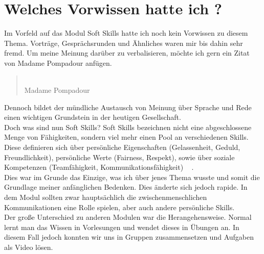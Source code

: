 \chapter{Welches Vorwissen hatte ich ? }

Im Vorfeld auf das Modul \dq Soft Skills \dq hatte ich noch kein Vorwissen zu diesem Thema. Vorträge, Gesprächsrunden und Ähnliches waren mir bis dahin sehr fremd. Um meine Meinung darüber zu verbalisieren, möchte ich gern ein Zitat von Madame Pompadour anfügen.

\begin{quote}
	 \dq \\
     Madame Pompadour
\end{quote}

Dennoch bildet der mündliche Austausch von Meinung über Sprache und Rede einen wichtigen Grundstein in der heutigen Gesellschaft.  \\

Doch was sind nun Soft Skills? 
Soft Skills bezeichnen nicht eine abgeschlossene Menge von Fähigkeiten, sondern viel mehr einen Pool an verschiedenen Skills. Diese definieren sich über persönliche Eigenschaften (Gelassenheit, Geduld, Freundlichkeit), persönliche Werte (Fairness, Respekt), sowie über soziale Kompetenzen (Teamfähigkeit, Kommunikationsfähigkeit)  ~\cite{SoSk} . \\

Dies war im Grunde das Einzige, was ich über jenes Thema wusste und somit die Grundlage meiner anfänglichen Bedenken. Dies änderte sich jedoch rapide.
In dem Modul sollten zwar hauptsächlich die zwischenmenschlichen Kommunikationen eine Rolle spielen, aber auch andere persönliche Skills.\\

Der große Unterschied zu anderen Modulen war die Herangehensweise. Normal lernt man das Wissen in Vorlesungen und wendet dieses in Übungen an. In diesem Fall jedoch konnten wir uns in Gruppen zusammensetzen und Aufgaben als Video lösen.